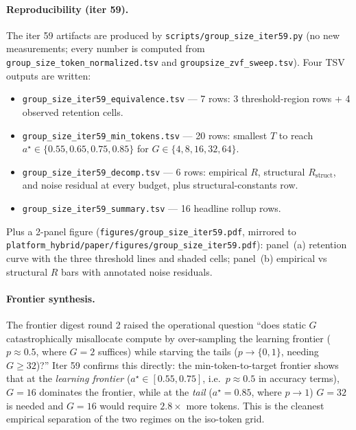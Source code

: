 \paragraph{Reproducibility (iter 59).}
The iter 59 artifacts are produced by
\texttt{scripts/group\_size\_iter59.py} (no new measurements; every
number is computed from \texttt{group\_size\_token\_normalized.tsv}
and \texttt{groupsize\_zvf\_sweep.tsv}).  Four TSV outputs are
written:
\begin{itemize}
  \item \texttt{group\_size\_iter59\_equivalence.tsv} --- 7 rows: 3
        threshold-region rows + 4 observed retention cells.
  \item \texttt{group\_size\_iter59\_min\_tokens.tsv} --- 20 rows:
        smallest $T$ to reach $a^\star \in \{0.55, 0.65, 0.75, 0.85\}$
        for $G \in \{4, 8, 16, 32, 64\}$.
  \item \texttt{group\_size\_iter59\_decomp.tsv} --- 6 rows:
        empirical $R$, structural $R_{\mathrm{struct}}$, and noise
        residual at every budget, plus structural-constants row.
  \item \texttt{group\_size\_iter59\_summary.tsv} --- 16 headline
        rollup rows.
\end{itemize}
Plus a 2-panel figure (\texttt{figures/group\_size\_iter59.pdf},
mirrored to \texttt{platform\_hybrid/paper/figures/group\_size\_iter59.pdf}):
panel~(a) retention curve with the three threshold lines and shaded
cells; panel~(b) empirical vs structural $R$ bars with annotated
noise residuals.

\paragraph{Frontier synthesis.}
The frontier digest round 2 raised the operational question
``does static $G$ catastrophically misallocate compute by
over-sampling the learning frontier ($p \approx 0.5$, where
$G{=}2$ suffices) while starving the tails ($p \to \{0, 1\}$,
needing $G \geq 32$)?''  Iter 59 confirms this directly: the
min-token-to-target frontier shows that at the
\emph{learning frontier} ($a^\star \in [0.55, 0.75]$, i.e.\
$p \approx 0.5$ in accuracy terms), $G{=}16$ dominates the
frontier, while at the \emph{tail} ($a^\star = 0.85$, where
$p \to 1$) $G{=}32$ is needed and $G{=}16$ would require
$2.8 \times$ more tokens.  This is the cleanest empirical
separation of the two regimes on the iso-token grid.